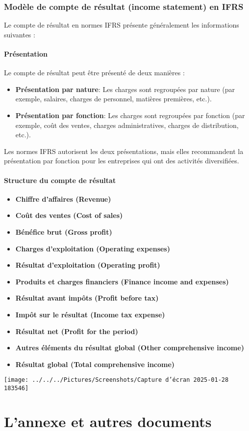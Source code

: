 \documentclass[a4paper, 12pt]{report}
\begin{document}
\subsubsection{Modèle de compte de résultat (income statement) en IFRS}

Le compte de résultat en normes IFRS présente généralement les informations suivantes :

\paragraph{Présentation}

Le compte de résultat peut être présenté de deux manières :

\begin{itemize}
	\item \textbf{Présentation par nature}: Les charges sont regroupées par nature (par exemple, salaires, charges de personnel, matières premières, etc.).
	\item \textbf{Présentation par fonction}: Les charges sont regroupées par fonction (par exemple, coût des ventes, charges administratives, charges de distribution, etc.).
\end{itemize}

Les normes IFRS autorisent les deux présentations, mais elles recommandent la présentation par fonction pour les entreprises qui ont des activités diversifiées.

\paragraph{Structure du compte de résultat}

\begin{itemize}
	\item \textbf{Chiffre d'affaires (Revenue)}
	\item \textbf{Coût des ventes (Cost of sales)}
	\item \textbf{Bénéfice brut (Gross profit)}
	\item \textbf{Charges d'exploitation (Operating expenses)}
	\item \textbf{Résultat d'exploitation (Operating profit)}
	\item \textbf{Produits et charges financiers (Finance income and expenses)}
	\item \textbf{Résultat avant impôts (Profit before tax)}
	\item \textbf{Impôt sur le résultat (Income tax expense)}
	\item \textbf{Résultat net (Profit for the period)}
	\item \textbf{Autres éléments du résultat global (Other comprehensive income)}
	\item \textbf{Résultat global (Total comprehensive income)}
\end{itemize}

\begin{center}
	\texttt{[image: ../../../Pictures/Screenshots/Capture d'écran 2025-01-28 183546]}
\end{center}

\section{L'annexe et autres documents}
\end{document}
